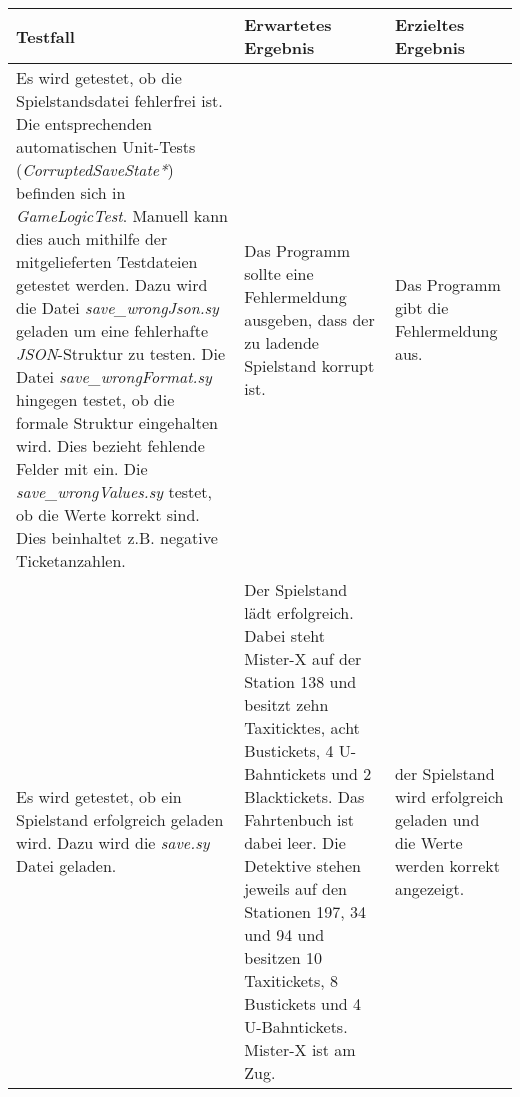     \begin{table}[H]
        \caption{Spielstand Tests}
        \begin{longtable}{p{6cm} p{4cm} p{2cm}} 
            \hline
            \textbf{Testfall} & \textbf{Erwartetes Ergebnis} & \textbf{Erzieltes Ergebnis}\\
            \hline
            \endfirsthead
            Es wird getestet, ob die Spielstandsdatei fehlerfrei ist.
            Die entsprechenden automatischen Unit-Tests (\textit{CorruptedSaveState*}) befinden sich in \textit{GameLogicTest}.
            Manuell kann dies auch mithilfe der mitgelieferten Testdateien getestet werden.
            Dazu wird die Datei \textit{save\_wrongJson.sy} geladen um eine fehlerhafte \textit{JSON}-Struktur zu testen.
            Die Datei \textit{save\_wrongFormat.sy} hingegen testet, ob die formale Struktur eingehalten wird.
            Dies bezieht fehlende Felder mit ein.
            Die \textit{save\_wrongValues.sy} testet, ob die Werte korrekt sind. Dies beinhaltet z.B. negative Ticketanzahlen.
            &
            Das Programm sollte eine Fehlermeldung ausgeben, dass der zu ladende Spielstand korrupt ist.
            &
            Das Programm gibt die Fehlermeldung aus.
            \\
            \hline
            Es wird getestet, ob ein Spielstand erfolgreich geladen wird.
            Dazu wird die \textit{save.sy} Datei geladen.
            &
            Der Spielstand lädt erfolgreich. Dabei steht Mister-X auf der Station 138 und besitzt zehn Taxiticktes,
            acht Bustickets, 4 U-Bahntickets und 2 Blacktickets. Das Fahrtenbuch ist dabei leer.
            Die Detektive stehen jeweils auf den Stationen 197, 34 und 94 und besitzen 10 Taxitickets, 8 Bustickets und 4 U-Bahntickets.
            Mister-X ist am Zug.
            &
            der Spielstand wird erfolgreich geladen und die Werte werden korrekt angezeigt.
            \\
            \hline
        \end{longtable}
    \end{table}


